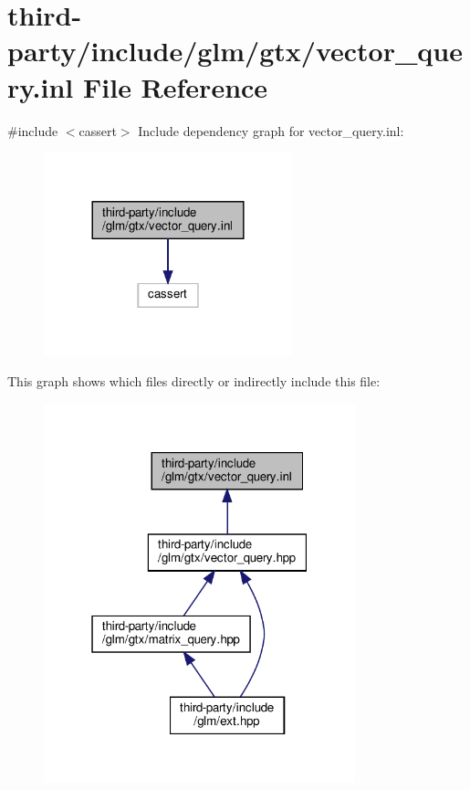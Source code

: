 \hypertarget{vector__query_8inl}{}\section{third-\/party/include/glm/gtx/vector\+\_\+query.inl File Reference}
\label{vector__query_8inl}
{\ttfamily \#include $<$cassert$>$}\newline
Include dependency graph for vector\+\_\+query.\+inl\+:
\nopagebreak
\begin{figure}[H]
\begin{center}
\leavevmode
\includegraphics[width=204pt]{vector__query_8inl__incl}
\end{center}
\end{figure}
This graph shows which files directly or indirectly include this file\+:
\nopagebreak
\begin{figure}[H]
\begin{center}
\leavevmode
\includegraphics[width=256pt]{vector__query_8inl__dep__incl}
\end{center}
\end{figure}

